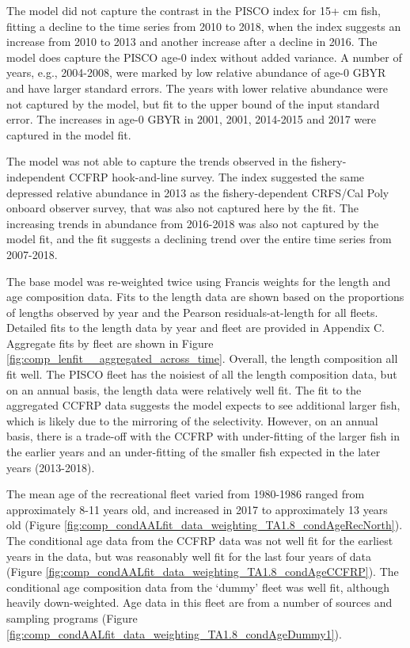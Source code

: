 \documentclass[12pt,]{article}
\begin{document}
The model did not capture the contrast in the PISCO index for 15+ cm
fish, fitting a decline to the time series from 2010 to 2018, when the
index suggests an increase from 2010 to 2013 and another increase after
a decline in 2016. The model does capture the PISCO age-0 index without
added variance. A number of years, e.g., 2004-2008, were marked by low
relative abundance of age-0 GBYR and have larger standard errors. The
years with lower relative abundance were not captured by the model, but
fit to the upper bound of the input standard error. The increases in
age-0 GBYR in 2001, 2001, 2014-2015 and 2017 were captured in the model
fit.

The model was not able to capture the trends observed in the
fishery-independent CCFRP hook-and-line survey. The index suggested the
same depressed relative abundance in 2013 as the fishery-dependent
CRFS/Cal Poly onboard observer survey, that was also not captured here
by the fit. The increasing trends in abundance from 2016-2018 was also
not captured by the model fit, and the fit suggests a declining trend
over the entire time series from 2007-2018.

The base model was re-weighted twice using Francis weights for the
length and age composition data. Fits to the length data are shown based
on the proportions of lengths observed by year and the Pearson
residuals-at-length for all fleets. Detailed fits to the length data by
year and fleet are provided in Appendix C. Aggregate fits by fleet are
shown in Figure \ref{fig:comp_lenfit__aggregated_across_time}. Overall,
the length composition all fit well. The PISCO fleet has the noisiest of
all the length composition data, but on an annual basis, the length data
were relatively well fit. The fit to the aggregated CCFRP data suggests
the model expects to see additional larger fish, which is likely due to
the mirroring of the selectivity. However, on an annual basis, there is
a trade-off with the CCFRP with under-fitting of the larger fish in the
earlier years and an under-fitting of the smaller fish expected in the
later years (2013-2018).

The mean age of the recreational fleet varied from 1980-1986 ranged from
approximately 8-11 years old, and increased in 2017 to approximately 13
years old (Figure
\ref{fig:comp_condAALfit_data_weighting_TA1.8_condAgeRecNorth}). The
conditional age data from the CCFRP data was not well fit for the
earliest years in the data, but was reasonably well fit for the last
four years of data (Figure
\ref{fig:comp_condAALfit_data_weighting_TA1.8_condAgeCCFRP}). The
conditional age composition data from the `dummy' fleet was well fit,
although heavily down-weighted. Age data in this fleet are from a number
of sources and sampling programs (Figure
\ref{fig:comp_condAALfit_data_weighting_TA1.8_condAgeDummy1}).
\end{document}
